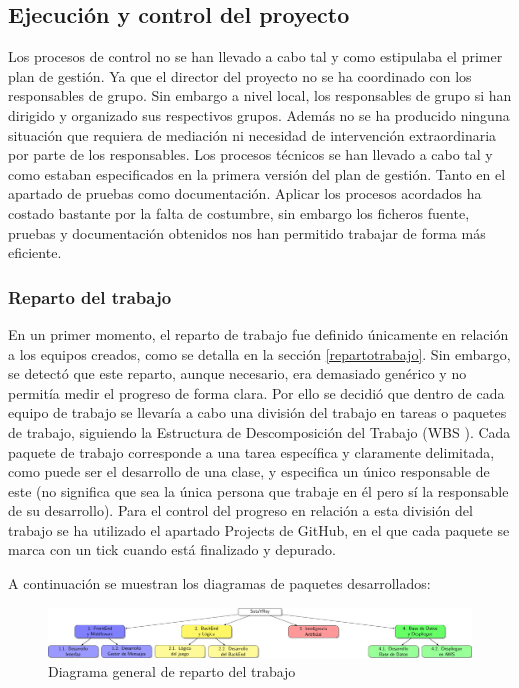 \subsection{Ejecución y control del proyecto}
\label{Ejecucion y control del proyecto}
Los procesos de control no se han llevado a cabo tal y como estipulaba el primer plan de gestión. Ya que el director del proyecto no se ha coordinado con los responsables de grupo. Sin embargo a nivel local, los responsables de grupo si han dirigido y organizado sus respectivos grupos. Además no se ha producido ninguna situación que requiera de mediación ni necesidad de intervención extraordinaria por parte de los responsables. 
Los procesos técnicos se han llevado a cabo tal y como estaban especificados en la primera versión del plan de gestión. Tanto en el apartado de pruebas como documentación. Aplicar los procesos acordados ha costado bastante por la falta de costumbre, sin embargo los ficheros fuente, pruebas y documentación obtenidos nos han permitido trabajar de forma más eficiente.
\subsubsection{Reparto del trabajo}
En un primer momento, el reparto de trabajo fue definido únicamente en relación a los equipos creados, como se detalla en la sección \ref{repartotrabajo}. Sin embargo, se detectó que este reparto, aunque necesario, era demasiado genérico y no permitía medir el progreso de forma clara. Por ello se decidió que dentro de cada equipo de trabajo se llevaría a cabo una división del trabajo en tareas o paquetes de trabajo, siguiendo la Estructura de Descomposición del Trabajo (WBS \cite{edt}). Cada paquete de trabajo corresponde a una tarea específica y claramente delimitada, como puede ser el desarrollo de una clase, y especifica un único responsable de este (no significa que sea la única persona que trabaje en él pero sí la responsable de su desarrollo). Para el control del progreso en relación a esta división del trabajo se ha utilizado el apartado Projects de GitHub, en el que cada paquete se marca con un tick cuando está finalizado y depurado.

A continuación se muestran los diagramas de paquetes desarrollados:

\begin{figure}[H]
		\hspace{-2cm}
		\includegraphics[scale=0.6]{figuras/edtGeneral.pdf}
		\caption{Diagrama general de reparto del trabajo}
	\end{figure}

